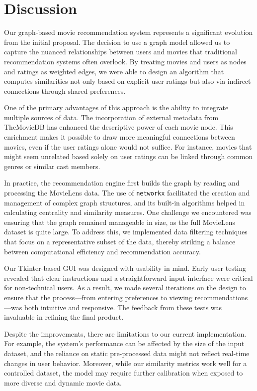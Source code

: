 \documentclass[12pt]{article}
\begin{document}
\section{Discussion}
Our graph-based movie recommendation system represents a significant evolution from the initial proposal. The decision to use a graph model allowed us to capture the nuanced relationships between users and movies that traditional recommendation systems often overlook. By treating movies and users as nodes and ratings as weighted edges, we were able to design an algorithm that computes similarities not only based on explicit user ratings but also via indirect connections through shared preferences.

One of the primary advantages of this approach is the ability to integrate multiple sources of data. The incorporation of external metadata from TheMovieDB has enhanced the descriptive power of each movie node. This enrichment makes it possible to draw more meaningful connections between movies, even if the user ratings alone would not suffice. For instance, movies that might seem unrelated based solely on user ratings can be linked through common genres or similar cast members.

In practice, the recommendation engine first builds the graph by reading and processing the MovieLens data. The use of \texttt{networkx} facilitated the creation and management of complex graph structures, and its built-in algorithms helped in calculating centrality and similarity measures. One challenge we encountered was ensuring that the graph remained manageable in size, as the full MovieLens dataset is quite large. To address this, we implemented data filtering techniques that focus on a representative subset of the data, thereby striking a balance between computational efficiency and recommendation accuracy.

Our Tkinter-based GUI was designed with usability in mind. Early user testing revealed that clear instructions and a straightforward input interface were critical for non-technical users. As a result, we made several iterations on the design to ensure that the process—from entering preferences to viewing recommendations—was both intuitive and responsive. The feedback from these tests was invaluable in refining the final product.

Despite the improvements, there are limitations to our current implementation. For example, the system’s performance can be affected by the size of the input dataset, and the reliance on static pre-processed data might not reflect real-time changes in user behavior. Moreover, while our similarity metrics work well for a controlled dataset, the model may require further calibration when exposed to more diverse and dynamic movie data.
\end{document}
